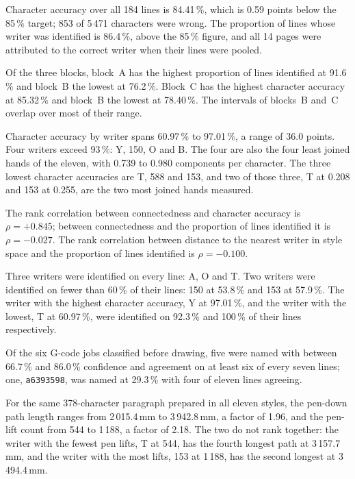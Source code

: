         \medskip

        Character accuracy over all 184 lines is 84.41\,\%, which is 0.59 points
        below the 85\,\% target; 853 of 5\,471 characters were wrong. The
        proportion of lines whose writer was identified is 86.4\,\%, above the
        85\,\% figure, and all 14 pages were attributed to the correct writer
        when their lines were pooled.

        Of the three blocks, block~A has the highest proportion of lines
        identified at 91.6\,\% and block~B the lowest at 76.2\,\%. Block~C has
        the highest character accuracy at 85.32\,\% and block~B the lowest at
        78.40\,\%. The intervals of blocks~B and~C overlap over most of their
        range.

        Character accuracy by writer spans 60.97\,\% to 97.01\,\%, a range of
        36.0 points. Four writers exceed 93\,\%: Y, 150, O and B. The four are
        also the four least joined hands of the eleven, with 0.739 to 0.980
        components per character. The three lowest character accuracies are T,
        588 and 153, and two of those three, T at 0.208 and 153 at 0.255, are the
        two most joined hands measured.

        The rank correlation between connectedness and character accuracy is
        $\rho=+0.845$; between connectedness and the proportion of lines
        identified it is $\rho=-0.027$. The rank correlation between distance to
        the nearest writer in style space and the proportion of lines identified
        is $\rho=-0.100$.

        Three writers were identified on every line: A, O and T. Two writers
        were identified on fewer than 60\,\% of their lines: 150 at 53.8\,\% and
        153 at 57.9\,\%. The writer with the highest character accuracy, Y at
        97.01\,\%, and the writer with the lowest, T at 60.97\,\%, were
        identified on 92.3\,\% and 100\,\% of their lines respectively.

        Of the six G-code jobs classified before drawing, five were named with
        between 66.7\,\% and 86.0\,\% confidence and agreement on at least six of
        every seven lines; one, \texttt{a6393598}, was named at 29.3\,\% with
        four of eleven lines agreeing.

        For the same 378-character paragraph prepared in all eleven styles, the
        pen-down path length ranges from 2\,015.4\,mm to 3\,942.8\,mm, a factor
        of 1.96, and the pen-lift count from 544 to 1\,188, a factor of 2.18.
        The two do not rank together: the writer with the fewest pen lifts, T at
        544, has the fourth longest path at 3\,157.7\,mm, and the writer with
        the most lifts, 153 at 1\,188, has the second longest at 3\,494.4\,mm.

